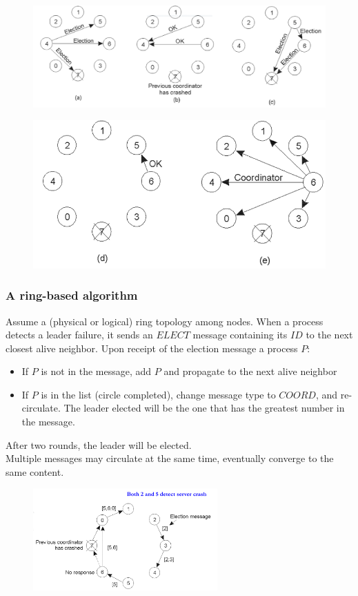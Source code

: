 \documentclass[10pt,a4paper]{article}
\begin{document}
\begin{figure}[h!]
\centering
\begin{minipage}{.5\textwidth}
  \centering
  \includegraphics[width=.9\linewidth]{images/bully1.png}
  \label{fig:bully1}
\end{minipage}%
\begin{minipage}{.5\textwidth}
  \centering
  \includegraphics[width=.7\linewidth]{images/bully2.png}
  \label{fig:bully2}
\end{minipage}
\end{figure}
\subsubsection{A ring-based algorithm}
Assume a (physical or logical) ring topology among nodes. When a process detects a leader failure, it sends an $ELECT$ message containing its $ID$ to the next closest alive neighbor. Upon receipt of the election message a process $P$:
\begin{itemize}
	\item If $P$ is not in the message, add $P$ and propagate to the next alive neighbor
	\item If $P$ is in the list (circle completed), change message type to $COORD$, and re-circulate. The leader elected will be the one that has the greatest number in the message.
\end{itemize}
After two rounds, the leader will be elected.\\ Multiple messages may circulate at the same time, eventually converge to the same content.
\begin{figure}[h!]
 \hfill \includegraphics[width=200pt]{images/ring-me.png}\hspace*{\fill}
  \label{fig:ring-me}
\end{figure}
\end{document}
